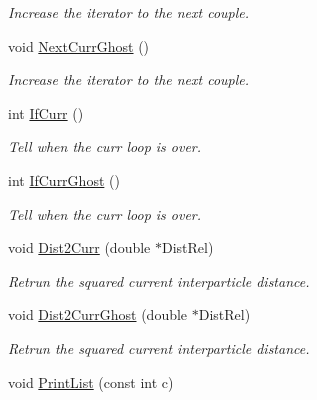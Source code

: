 \begin{DoxyCompactItemize}
\begin{DoxyCompactList}\small\item\em Increase the iterator to the next couple. \end{DoxyCompactList}\item 
void \hyperlink{classDdLinkedList_a570f38547139c0b1405fde555f276b9c}{Next\+Curr\+Ghost} ()\hypertarget{classDdLinkedList_a570f38547139c0b1405fde555f276b9c}{}\label{classDdLinkedList_a570f38547139c0b1405fde555f276b9c}

\begin{DoxyCompactList}\small\item\em Increase the iterator to the next couple. \end{DoxyCompactList}\item 
int \hyperlink{classDdLinkedList_a63c5d18d3a487d1a8ab2a5881c6acb38}{If\+Curr} ()
\begin{DoxyCompactList}\small\item\em Tell when the curr loop is over. \end{DoxyCompactList}\item 
int \hyperlink{classDdLinkedList_a1473510db4cdf7f15b2875ad737e351e}{If\+Curr\+Ghost} ()\hypertarget{classDdLinkedList_a1473510db4cdf7f15b2875ad737e351e}{}\label{classDdLinkedList_a1473510db4cdf7f15b2875ad737e351e}

\begin{DoxyCompactList}\small\item\em Tell when the curr loop is over. \end{DoxyCompactList}\item 
void \hyperlink{classDdLinkedList_ad4860e7b4a26d4b424e5c98b7c6bae09}{Dist2\+Curr} (double $\ast$Dist\+Rel)
\begin{DoxyCompactList}\small\item\em Retrun the squared current interparticle distance. \end{DoxyCompactList}\item 
void \hyperlink{classDdLinkedList_a88042fab4b1c26be298e1b40f7409cd3}{Dist2\+Curr\+Ghost} (double $\ast$Dist\+Rel)
\begin{DoxyCompactList}\small\item\em Retrun the squared current interparticle distance. \end{DoxyCompactList}\item 
void \hyperlink{classDdLinkedList_abacbda4ce7eed0eee33efe489157ff81}{Print\+List} (const int c)\hypertarget{classDdLinkedList_abacbda4ce7eed0eee33efe489157ff81}{}\label{classDdLinkedList_abacbda4ce7eed0eee33efe489157ff81}


\end{DoxyCompactItemize}
